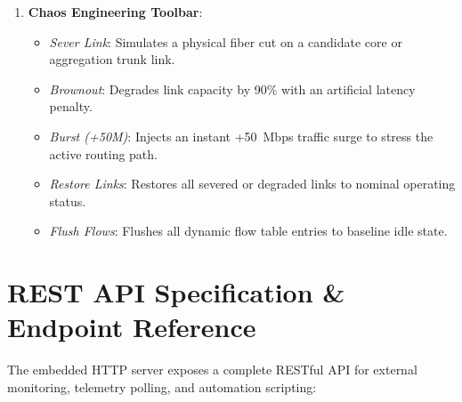 \documentclass[12pt,a4paper,oneside]{report}
\begin{document}
\begin{enumerate}
    \item \textbf{Chaos Engineering Toolbar}:
    \begin{itemize}
        \item \textit{Sever Link}: Simulates a physical fiber cut on a candidate core or aggregation trunk link.
        \item \textit{Brownout}: Degrades link capacity by 90\% with an artificial latency penalty.
        \item \textit{Burst (+50M)}: Injects an instant +50~Mbps traffic surge to stress the active routing path.
        \item \textit{Restore Links}: Restores all severed or degraded links to nominal operating status.
        \item \textit{Flush Flows}: Flushes all dynamic flow table entries to baseline idle state.
    \end{itemize}
\end{enumerate}

\section{REST API Specification \& Endpoint Reference}
The embedded HTTP server exposes a complete RESTful API for external monitoring, telemetry polling, and automation scripting:
\end{document}

